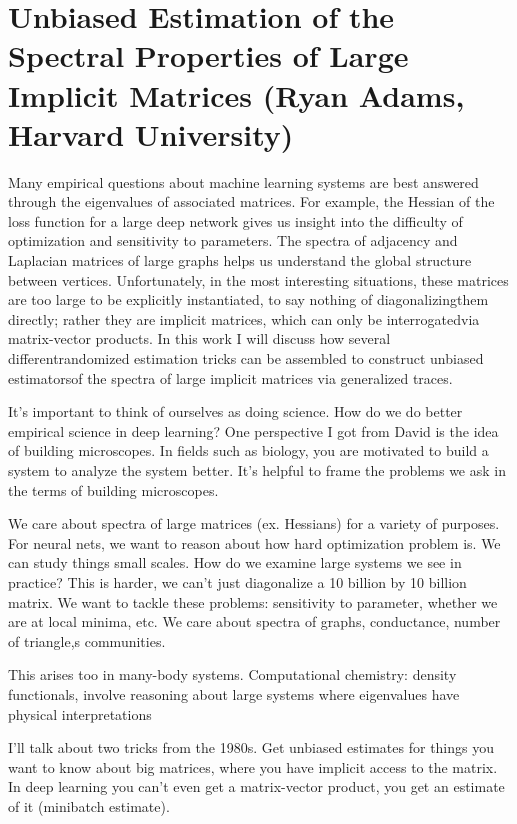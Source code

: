 \section{Unbiased Estimation of the Spectral Properties of Large Implicit Matrices (Ryan Adams, Harvard University)}

Many empirical questions about machine learning systems are best answered through the eigenvalues of associated matrices.  For example, the Hessian of the loss function for a large deep network gives us insight into the difficulty of optimization and sensitivity to parameters.  The spectra of adjacency and Laplacian matrices of large graphs helps us understand the global structure between vertices.  Unfortunately, in the most interesting situations, these matrices are too large to be explicitly instantiated, to say nothing of diagonalizingthem directly; rather they are implicit matrices, which can only be interrogatedvia matrix-vector products.  In this work I will discuss how several differentrandomized estimation tricks can be assembled to construct unbiased estimatorsof the spectra of large implicit matrices via generalized traces.

It's important to think of ourselves as doing science. How do we do better empirical science in deep learning? One perspective I got from David is the idea of building microscopes. In fields such as biology, you are motivated to build a system to analyze the system better. It's helpful to frame the problems we ask in the terms of building microscopes. 

We care about spectra of large matrices (ex. Hessians) for a variety of purposes. For neural nets, we want to reason about how hard optimization problem is. We can study things small scales. How do we examine large systems we see in practice? This is harder, we can't just diagonalize a 10 billion by 10 billion matrix. We want to tackle these problems: sensitivity to parameter, whether we are at local minima, etc. We care about spectra of graphs, conductance, number of triangle,s communities.

This arises too in many-body systems. Computational chemistry: density functionals, involve reasoning about large systems where eigenvalues have physical interpretations

I'll talk about two tricks from the 1980s. Get unbiased estimates for things you want to know about big matrices, where you have implicit access to the matrix. In deep learning you can't even get a matrix-vector product, you get an estimate of it (minibatch estimate).


